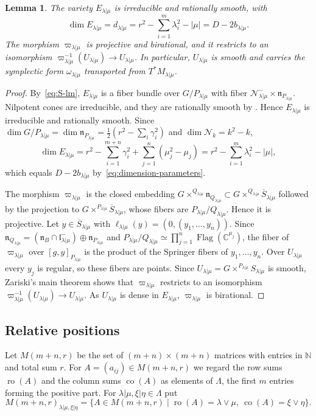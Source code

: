 \documentclass[11pt,a4paper]{amsart}
\newtheorem{lemma}[theorem]{Lemma}
\theoremstyle{definition}
\theoremstyle{remark}
\newcommand{\C}{\mathbb C}
\newcommand{\N}{\mathcal N}
\newcommand{\Flag}{\operatorname{Flag}}
\newcommand{\lm}{\lambda|\mu}
\newcommand{\xh}{\xi|\eta}
\newcommand{\Mat}{M(m+n,r)}
\newcommand{\ro}{\operatorname{ro}}
\newcommand{\co}{\operatorname{co}}
\numberwithin{equation}{section}
\begin{document}
\begin{lemma}\label{lem:dimension-space}
The variety $E_{\lm}$ is irreducible and rationally smooth, with
\begin{equation}\label{eq:dimension-space}
\dim E_{\lm}=d_{\lm}
=r^2-\sum_{i=1}^m\lambda_i^2-|\mu|
=D-2b_{\lm}.
\end{equation}
The morphism $\varpi_{\lm}$ is projective and birational, and it restricts
to an isomorphism $\varpi_{\lm}^{-1}(U_{\lm})\to U_{\lm}$. In particular,
$U_{\lm}$ is smooth and carries the symplectic form $\omega_{\lm}$
transported from $T^*M_{\lm}$.
\end{lemma}
\begin{proof}
By~\eqref{eq:S-lm}, $E_{\lm}$ is a fiber bundle over $G/P_{\lm}$ with
fiber $\N_{\lm}^-\times\mathfrak n_{P_{\lm}}$. Nilpotent cones are
irreducible, and they are rationally smooth by \cite[Section~2.3, p.~49]{BM}.
Hence $E_{\lm}$ is irreducible and rationally smooth. Since $\dim G/P_{\lm}=\dim\mathfrak n_{P_{\lm}}
=\frac12(r^2-\sum_i\gamma_i^2)$ and $\dim\N_k=k^2-k$,
$$
\dim E_{\lm}=r^2-\sum_{i=1}^{m+n}\gamma_i^2+\sum_{j=1}^n(\mu_j^2-\mu_j)
=r^2-\sum_{i=1}^m\lambda_i^2-|\mu|,
$$
which equals $D-2b_{\lm}$ by~\eqref{eq:dimension-parameters}.

The morphism $\varpi_{\lm}$ is the closed embedding
$G\times^{Q_{\lm}}\mathfrak n_{Q_{\lm}}\subset
G\times^{Q_{\lm}}\overline S_{\lm}$ followed by the projection to
$G\times^{P_{\lm}}\overline S_{\lm}$, whose fibers are
$P_{\lm}/Q_{\lm}$. Hence it is projective. Let $y\in\overline S_{\lm}$
with $\ell_{\lm}(y)=(0,(y_1,\ldots,y_n))$. Since
$\mathfrak n_{Q_{\lm}}=(\mathfrak n_B\cap\mathfrak l_{\lm}^-)\oplus
\mathfrak n_{P_{\lm}}$ and
$P_{\lm}/Q_{\lm}\simeq\prod_{j=1}^n\Flag(\C^{\mu_j})$, the fiber of
$\varpi_{\lm}$ over $[g,y]_{P_{\lm}}$ is the product of the Springer
fibers of $y_1,\ldots,y_n$. Over $U_{\lm}$ every $y_j$ is regular, so these fibers are points. Since
$U_{\lm}=G\times^{P_{\lm}}S_{\lm}$ is smooth, Zariski's main theorem
shows that $\varpi_{\lm}$ restricts to an isomorphism
$\varpi_{\lm}^{-1}(U_{\lm})\to U_{\lm}$. As $U_{\lm}$ is dense in
$E_{\lm}$, $\varpi_{\lm}$ is birational.
\end{proof}

\subsection{Relative positions}
\label{sec:orbits}

Let $\Mat$ be the set of $(m+n)\times(m+n)$ matrices with entries in
$\mathbb N$ and total sum $r$. For $A=(a_{ij})\in\Mat$ we regard the
row sums $\ro(A)$ and the column sums $\co(A)$ as elements of $\Lambda$,
the first $m$ entries forming the positive part. For $\lm,\xh\in\Lambda$
put
$$
\Mat_{\lm,\xh}=\{A\in\Mat\mid\ro(A)=\lambda\vee\mu,\ \co(A)=\xi\vee\eta\}.
$$
\end{document}
